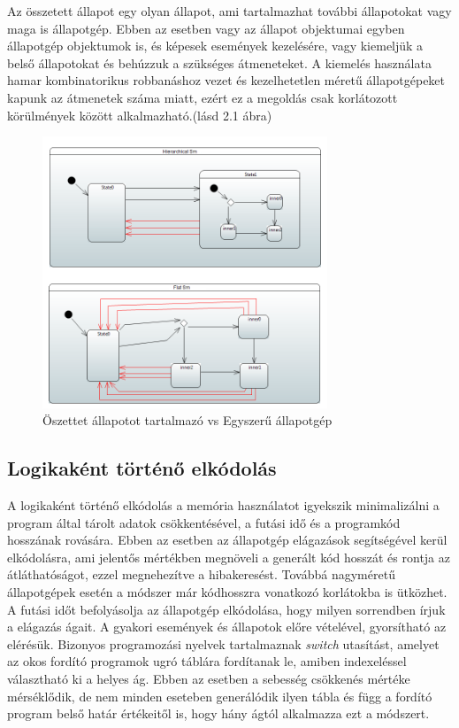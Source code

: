 \documentclass[a4paper,12pt]{report}
\begin{document}
Az összetett állapot egy olyan állapot, ami tartalmazhat további állapotokat vagy maga is állapotgép. Ebben az esetben vagy az állapot objektumai egyben állapotgép objektumok is, és képesek események kezelésére, vagy kiemeljük a belső állapotokat és behúzzuk a szükséges átmeneteket. A kiemelés használata hamar kombinatorikus robbanáshoz vezet és kezelhetetlen méretű állapotgépeket kapunk az átmenetek száma miatt, ezért ez a megoldás csak korlátozott körülmények között alkalmazható.(lásd 2.1 ábra)

\begin{figure}[hbtp]
\centering
\includegraphics[width=0.76\textwidth]{hierflatcol.png}
\caption{Öszettet állapotot tartalmazó vs Egyszerű állapotgép}
\label{fig:he}
\end{figure}

\subsection{Logikaként történő elkódolás}

A logikaként történő elkódolás a memória használatot igyekszik minimalizálni a program által tárolt adatok csökkentésével, a futási idő és a programkód hosszának rovására.
Ebben az esetben az állapotgép elágazások segítségével kerül elkódolásra, ami jelentős mértékben megnöveli a generált kód hosszát és rontja az átláthatóságot, ezzel megnehezítve a hibakeresést. Továbbá nagyméretű állapotgépek esetén a módszer már kódhosszra vonatkozó korlátokba is ütközhet. A futási időt befolyásolja az állapotgép elkódolása, hogy milyen sorrendben írjuk a elágazás ágait. A gyakori események és állapotok előre vételével, gyorsítható az elérésük. Bizonyos programozási nyelvek tartalmaznak {\it switch} utasítást, amelyet az okos fordító programok ugró táblára\cite{jt} fordítanak le, amiben indexeléssel választható ki a helyes ág. Ebben az esetben a sebesség csökkenés mértéke mérséklődik, de nem minden eseteben generálódik ilyen tábla és függ a fordító program belső határ értékeitől is, hogy hány ágtól alkalmazza ezt a módszert. %
\end{document}
